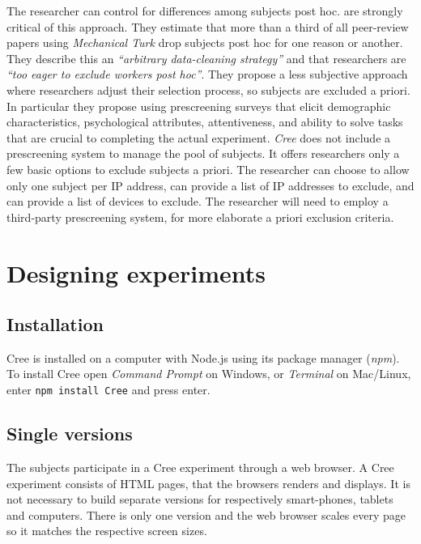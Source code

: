 \documentclass[preprint, 12pt]{elsarticle}
\newcommand{\Cree}{\emph{Cree}\xspace}
\begin{document}
The researcher can control for differences among subjects post hoc. \citet[p. 121]{Chandler_Mueller_Paolacci_2014} are strongly critical of this approach. They estimate that more than a third of all peer-review papers using \emph{Mechanical Turk} drop subjects post hoc for one reason or another. They describe this an \emph{``arbitrary data-cleaning strategy''} and that researchers are \emph{``too eager to exclude workers post hoc''}. They propose a less subjective approach where researchers adjust their selection process, so subjects are excluded a priori. In particular they propose using prescreening surveys that elicit demographic characteristics, psychological attributes, attentiveness, and ability to solve tasks that are crucial to completing the actual experiment. \Cree does not include a prescreening system to manage the pool of subjects. It offers researchers only a few basic options to exclude subjects a priori. The researcher can choose to allow only one subject per IP address, can provide a list of IP addresses to exclude, and can provide a list of devices to exclude. The researcher will need to employ a third-party prescreening system, for more elaborate a priori exclusion criteria.


\section{Designing experiments}
\label{S:Designing}

\subsection{Installation}

Cree is installed on a computer with Node.js using its package manager (\emph{npm}). To install Cree open \emph{Command Prompt} on Windows, or \emph{Terminal} on Mac/Linux, enter \texttt{npm~install~Cree} and press enter.

\subsection{Single versions}

The subjects participate in a Cree experiment through a web browser. A Cree experiment consists of HTML pages, that the browsers renders and displays. It is not necessary to build separate versions for respectively smart-phones, tablets and computers. There is only one version and the web browser scales every page so it matches the respective screen sizes. 
\end{document}
